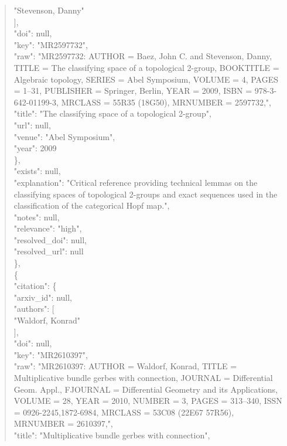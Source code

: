 \documentclass[11pt]{article}
\begin{document}
\begin{quote}
          "Stevenson, Danny"\\
        ],\\
        "doi": null,\\
        "key": "MR2597732",\\
        "raw": "MR2597732: AUTHOR = Baez, John C. and Stevenson, Danny, TITLE = The classifying space of a topological 2-group, BOOKTITLE = Algebraic topology, SERIES = Abel Symposium, VOLUME = 4, PAGES = 1--31, PUBLISHER = Springer, Berlin, YEAR = 2009, ISBN = 978-3-642-01199-3, MRCLASS = 55R35 (18G50), MRNUMBER = 2597732,",\\
        "title": "The classifying space of a topological 2-group",\\
        "url": null,\\
        "venue": "Abel Symposium",\\
        "year": 2009\\
      \},\\
      "exists": null,\\
      "explanation": "Critical reference providing technical lemmas on the classifying spaces of topological 2-groups and exact sequences used in the classification of the categorical Hopf map.",\\
      "notes": null,\\
      "relevance": "high",\\
      "resolved\_doi": null,\\
      "resolved\_url": null\\
    \},\\
    \{\\
      "citation": \{\\
        "arxiv\_id": null,\\
        "authors": [\\
          "Waldorf, Konrad"\\
        ],\\
        "doi": null,\\
        "key": "MR2610397",\\
        "raw": "MR2610397: AUTHOR = Waldorf, Konrad, TITLE = Multiplicative bundle gerbes with connection, JOURNAL = Differential Geom. Appl., FJOURNAL = Differential Geometry and its Applications, VOLUME = 28, YEAR = 2010, NUMBER = 3, PAGES = 313--340, ISSN = 0926-2245,1872-6984, MRCLASS = 53C08 (22E67 57R56), MRNUMBER = 2610397,",\\
        "title": "Multiplicative bundle gerbes with connection",\\

\end{quote}
\end{document}
